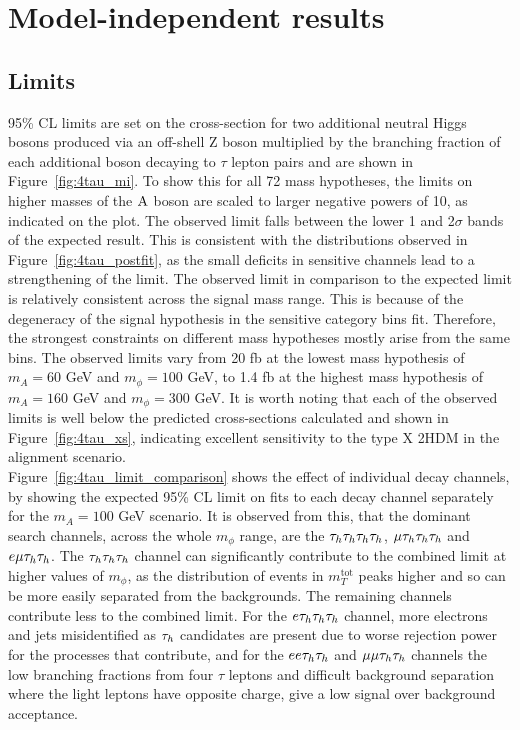 \section{Model-independent results}

\subsection{Limits}

95\% \ac{CL} limits are set on the cross-section for two additional neutral Higgs bosons produced via an off-shell Z boson multiplied by the branching fraction of each additional boson decaying to $\tau$ lepton pairs and are shown in Figure~\ref{fig:4tau_mi}.
To show this for all 72 mass hypotheses, the limits on higher masses of the ${\text{A}}$ boson are scaled to larger negative powers of 10, as indicated on the plot.
The observed limit falls between the lower 1 and 2$\sigma$ bands of the expected result.
This is consistent with the distributions observed in Figure~\ref{fig:4tau_postfit}, as the small deficits in sensitive channels lead to a strengthening of the limit.
The observed limit in comparison to the expected limit is relatively consistent across the signal mass range.
This is because of the degeneracy of the signal hypothesis in the sensitive category bins fit.
Therefore, the strongest constraints on different mass hypotheses mostly arise from the same bins.
The observed limits vary from 20 fb at the lowest mass hypothesis of $m_A = 60$ GeV and $m_{\phi} = 100$ GeV, to 1.4 fb at the highest mass hypothesis of $m_A = 160$ GeV and $m_{\phi} = 300$ GeV.
It is worth noting that each of the observed limits is well below the predicted cross-sections calculated and shown in Figure~\ref{fig:4tau_xs}, indicating excellent sensitivity to the type X \ac{2HDM} in the alignment scenario. \\

Figure~\ref{fig:4tau_limit_comparison} shows the effect of individual decay channels, by showing the expected 95\% \ac{CL} limit on fits to each decay channel separately for the $m_{A} = 100$ GeV scenario.
It is observed from this, that the dominant search channels, across the whole $m_{\phi}$ range, are the $\tau_{h}\tau_{h}\tau_{h}\tau_{h}$, $\mu\tau_{h}\tau_{h}\tau_{h}$ and $e\mu\tau_{h}\tau_{h}$.
The $\tau_{h}\tau_{h}\tau_{h}$ channel can significantly contribute to the combined limit at higher values of $m_{\phi}$, as the distribution of events in $m_{T}^{\text{tot}}$ peaks higher and so can be more easily separated from the \jtth backgrounds.
The remaining channels contribute less to the combined limit.
For the $e\tau_{h}\tau_{h}\tau_{h}$ channel, more electrons and jets misidentified as $\tau_{h}$ candidates are present due to worse rejection power for the processes that contribute, and for the $ee\tau_{h}\tau_{h}$ and $\mu\mu\tau_{h}\tau_{h}$ channels the low branching fractions from four $\tau$ leptons and difficult background separation where the light leptons have opposite charge, give a low signal over background acceptance.

